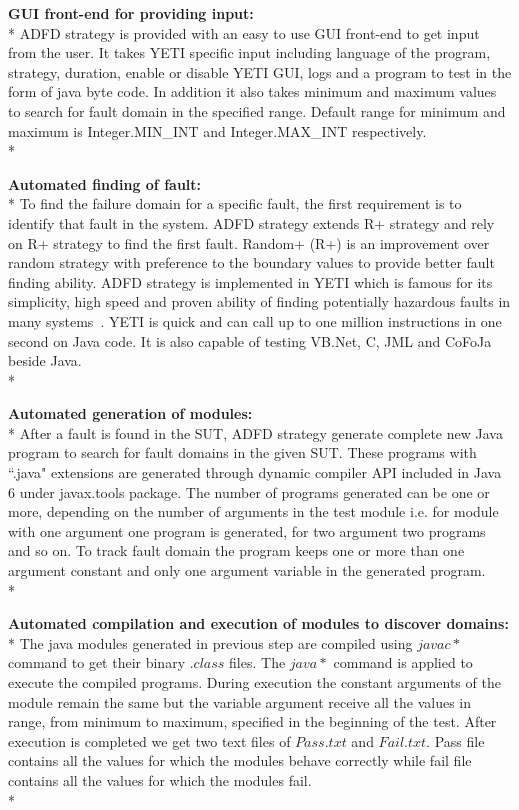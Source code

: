 \noindent \textbf{GUI front-end for providing input:}\\*
ADFD strategy is provided with an easy to use GUI front-end to get input from the user. It takes YETI specific input including language of the program, strategy, duration, enable or disable YETI GUI, logs and a program to test in the form of java byte code. In addition it also takes minimum and maximum values to search for fault domain in the specified range. Default range for minimum and maximum is Integer.MIN\_INT and Integer.MAX\_INT respectively.\\*

\noindent \textbf{Automated finding of fault:}\\*
To find the failure domain for a specific fault, the first requirement is to identify that fault in the system. ADFD strategy extends R+ strategy and rely on R+ strategy to find the first fault. Random+ (R+) is an improvement over random strategy with preference to the boundary values to provide better fault finding ability. ADFD strategy is implemented in YETI which is famous for its simplicity, high speed and proven ability of finding potentially hazardous faults in many systems~\cite{Oriol2011, Oriol2012}. YETI is quick and can call up to one million instructions in one second on Java code. It is also capable of testing VB.Net, C, JML and CoFoJa beside Java. \\*

\noindent \textbf{Automated generation of modules:}\\*
After a fault is found in the SUT, ADFD strategy generate complete new Java program to search for fault domains in the given SUT.  These programs with ``.java" extensions are generated through dynamic compiler API included in Java 6 under javax.tools package. The number of programs generated can be one or more, depending on the number of arguments in the test module i.e. for module with one argument one program is generated, for two argument two programs and so on. To track fault domain the program keeps one or more than one argument constant and only one argument variable in the generated program.\\*

\noindent \textbf{Automated compilation and execution of modules to discover domains:}\\*
The java modules generated in previous step are compiled using $javac *$ command to get their binary $.class$ files. The $java *$ command is applied to execute the compiled programs. During execution the constant arguments of the module remain the same but the variable argument receive all the values in range, from minimum to maximum, specified in the beginning of the test. After execution is completed we get two text files of $Pass.txt$ and $Fail.txt$. Pass file contains all the values for which the modules behave correctly while fail file contains all the values for which the modules fail.\\*

